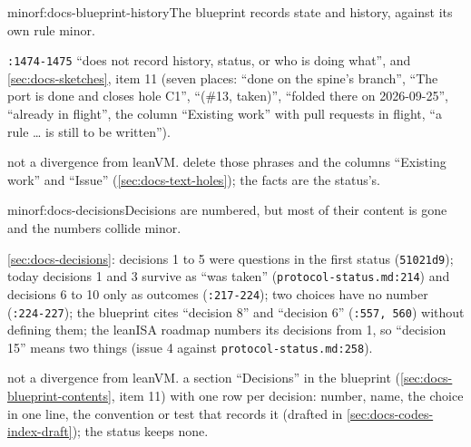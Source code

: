 \begin{finding}{minor}{f:docs-blueprint-history}{The blueprint records state and history, against its own rule}
 minor.
 \begin{sloppypar}
\texttt{:\allowbreak{}1474-\allowbreak{}1475} ``does not record history, status, or who is doing what'', and \cref{sec:docs-sketches}, item 11 (seven places: ``done on the spine's branch'', ``The port is done and closes hole C1'', ``(\#13, taken)'', ``folded there on 2026-09-25'', ``already in flight'', the column ``Existing work'' with pull requests in flight, ``a rule … is still to be written'').
\end{sloppypar}
 not a divergence from leanVM.
 delete those phrases and the columns ``Existing work'' and ``Issue'' (\cref{sec:docs-text-holes}); the facts are the status's.
\end{finding}

\begin{finding}{minor}{f:docs-decisions}{Decisions are numbered, but most of their content is gone and the numbers collide}
 minor.
 \begin{sloppypar}
\cref{sec:docs-decisions}: decisions 1 to 5 were questions in the first status (\texttt{51021d9}); today decisions 1 and 3 survive as ``was taken'' (\texttt{protocol-\allowbreak{}status.\allowbreak{}md:\allowbreak{}214}) and decisions 6 to 10 only as outcomes (\texttt{:\allowbreak{}217-\allowbreak{}224}); two choices have no number (\texttt{:\allowbreak{}224-\allowbreak{}227}); the blueprint cites ``decision 8'' and ``decision 6'' (\texttt{:\allowbreak{}557,\allowbreak{} 560}) without defining them; the leanISA roadmap numbers its decisions from 1, so ``decision 15'' means two things (issue 4 against \texttt{protocol-\allowbreak{}status.\allowbreak{}md:\allowbreak{}258}).
\end{sloppypar}
 not a divergence from leanVM.
 a section ``Decisions'' in the blueprint (\cref{sec:docs-blueprint-contents}, item 11) with one row per decision: number, name, the choice in one line, the convention or test that records it (drafted in \cref{sec:docs-codes-index-draft}); the status keeps none.
\end{finding}

